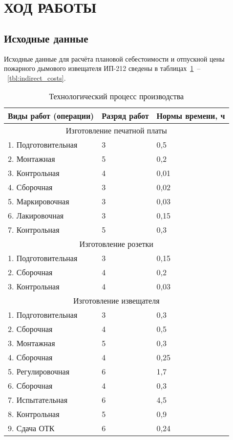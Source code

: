 \section{ХОД РАБОТЫ}

\subsection{Исходные данные}

Исходные данные для расчёта плановой себестоимости и отпускной цены пожарного
дымового извещателя ИП-212 сведены в
таблицах~\ref{tbl:technological_process}~--~\ref{tbl:indirect_costs}.

\begin{table}[h!]
  \caption{Технологический процесс производства}
  \label{tbl:technological_process}
  \centering
  \small{
    \begin{tabular}{| p{} | p{} | p{} |}
      \hline

      Виды работ (операции) & Разряд работ & Нормы времени, ч \\ \hline

      \multicolumn{3}{|c|}{Изготовление печатной платы} \\ \hline
      1. Подготовительная & 3 & 0,5  \\ \hline
      2. Монтажная        & 5 & 0,2  \\ \hline
      3. Контрольная      & 4 & 0,01 \\ \hline
      4. Сборочная        & 3 & 0,02 \\ \hline
      5. Маркировочная    & 3 & 0,03 \\ \hline
      6. Лакировочная     & 3 & 0,15 \\ \hline
      7. Контрольная      & 5 & 0,3  \\ \hline

      \multicolumn{3}{|c|}{Изготовление розетки} \\ \hline
      1. Подготовительная & 3 & 0,15 \\ \hline
      2. Сборочная        & 4 & 0,2  \\ \hline
      3. Контрольная      & 4 & 0,03 \\ \hline

      \multicolumn{3}{|c|}{Изготовление извещателя} \\ \hline
      1. Подготовительная & 3 & 0,3  \\ \hline
      2. Сборочная        & 4 & 0,5  \\ \hline
      3. Монтажная        & 5 & 0,3  \\ \hline
      4. Сборочная        & 4 & 0,25 \\ \hline
      5. Регулировочная   & 6 & 1,7  \\ \hline
      6. Сборочная        & 4 & 0,3  \\ \hline
      7. Испытательная    & 6 & 4,5  \\ \hline
      8. Контрольная      & 5 & 0,9  \\ \hline
      9. Сдача ОТК        & 6 & 0,24 \\ \hline


\end{tabular}}
\end{table}
